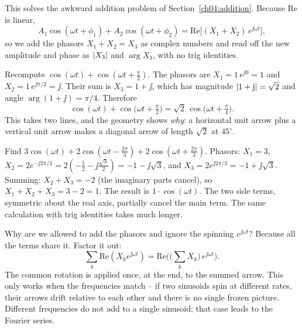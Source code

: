 This solves the awkward addition problem of Section~\ref{ch04:addition}. Because
$\mathrm{Re}$ is linear,
\[
  A_1\cos(\omega t+\phi_1) + A_2\cos(\omega t+\phi_2)
   = \mathrm{Re}\Big[(X_1 + X_2)\,e^{\jj\omega t}\Big],
\]
so we add the phasors $X_1 + X_2 = X_3$ as complex numbers and read off the new amplitude and
phase as $\lvert X_3\rvert$ and $\arg X_3$, with no trig identities.

\begin{example}
\label{ch04:ex-easy-sum}
Recompute $\cos(\omega t) + \cos(\omega t + \tfrac{\pi}{2})$. The phasors are $X_1 = 1\,e^{\jj 0} =
1$ and $X_2 = 1\,e^{\jj\pi/2} = \jj$. Their sum is $X_3 = 1 + \jj$, which has magnitude
$\lvert1+\mathrm{j}\rvert = \sqrt{2}$ and angle $\arg(1+\jj) = \pi/4$. Therefore
\[
  \cos(\omega t) + \cos\!\big(\omega t + \tfrac{\pi}{2}\big) = \sqrt{2}\,\cos\!\big(\omega t + \tfrac{\pi}{4}\big).
\]
This takes two lines, and the geometry shows \emph{why}: a horizontal unit arrow plus a vertical unit arrow makes a
diagonal arrow of length $\sqrt 2$ at $45^\circ$.
\end{example}

\begin{example}
\label{ch04:ex-three-sum}
Find $3\cos(\omega t) + 2\cos(\omega t - \tfrac{2\pi}{3}) + 2\cos(\omega t + \tfrac{2\pi}{3})$.
Phasors: $X_1 = 3$, $X_2 = 2e^{-\jj 2\pi/3} = 2(-\tfrac12 - \jj\tfrac{\sqrt3}{2}) = -1 - \jj\sqrt3$,
and $X_3 = 2e^{\jj 2\pi/3} = -1 + \jj\sqrt3$. Summing: $X_2 + X_3 = -2$ (the imaginary parts
cancel), so $X_1 + X_2 + X_3 = 3 - 2 = 1$. The result is $1\cdot\cos(\omega t)$. The two
side terms, symmetric about the real axis, partially cancel the main term. The same calculation with trig
identities takes much longer.
\end{example}

\begin{whybox}
Why are we allowed to add the phasors and ignore the spinning $e^{\jj\omega t}$? Because all the
terms share it. Factor it out:
\[
  \sum_k \mathrm{Re}(X_k e^{\jj\omega t}) = \mathrm{Re}\biggl(\Big(\sum_k X_k\Big)\,e^{\jj\omega t}\biggr).
\]
The common rotation is applied once, at the end, to the summed arrow. This only works when the frequencies match -- if two sinusoids spin at
different rates, their arrows drift relative to each other and there is no single frozen picture.
Different frequencies do not add to a single sinusoid; that case leads to the Fourier series.
\end{whybox}


